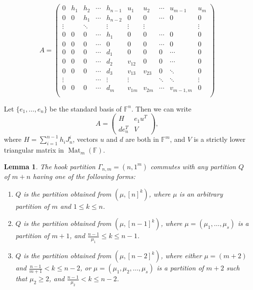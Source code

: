\documentclass[10pt,a4paper]{amsart}
\newtheorem{lem}[thm]{Lemma}
\begin{document}
\begin{equation}\label{generic in U}
A=\left(\begin{array}{ccccc|ccccc}
    0 & h_1 & h_2 & \cdots & h_{n-1} & u_1 & u_2 & \cdots & u_{m-1} & u_{m}\\
    0 & 0   & h_1 & \cdots & h_{n-2} & 0   & 0   & \cdots & 0        & 0\\
    \vdots &     & \ddots &        & \vdots & \vdots & \vdots &        &        & \vdots\\
    0 & 0   & 0   & \cdots & h_1     & 0   & 0   & \cdots & 0        & 0\\ 
     0 & 0   & 0   & \cdots & 0     & 0   & 0   & \cdots & 0        & 0\\
    \hline
    0 & 0   & 0   & \cdots & d_1     & 0   & 0   & 0 & \cdots       & 0\\
    0 & 0   & 0   & \cdots & d_2     & v_{12}   &0 & 0& \cdots      &0\\
    0 & 0   & 0   & \cdots & d_3     & v_{13}& v_{23}& 0 & \ddots  & 0\\
    \vdots &     &        & \cdots & \vdots & \vdots &       & \ddots & \ddots & \vdots\\
    0 & 0   & 0   & \cdots & d_m     & v_{1m} & v_{2m} & \cdots & v_{m-1,m} & 0\\
\end{array}
\right)
\end{equation}


Let $\{e_1, \ldots, e_n\}$ be the standard basis of $\mathbb{F}^n$. Then we can write 
\begin{equation}\label{blocks of generic in U}
A=\left( 
\begin{array}{c|c}
  H   & e_1 u^T \\
  \hline
  d e_n^T   & V
\end{array}
\right),
\end{equation}
where $H=\sum\limits_{i=1}^{n-1}h_iJ_n^i$, vectors $u$ and $d$ are both in $\mathbb{F}^m$, and $V$ is a strictly lower triangular matrix in $\operatorname{Mat}_{m}(\mathbb{F})$.

\begin{lem}\label{commute with hook}
    The hook partition $\Gamma_{n,m}=\left(n,1^m\right)$ commutes with any partition $Q$ of $m+n$ having one of the following forms:
    \begin{enumerate}
        \item[(a)] $Q$ is the partition obtained from $\left(\mu, [n]^k\right)$, where $\mu$ is an arbitrary partition of $m$ and $1\leq k\leq n$.
        \item[(b)] $Q$ is the partition obtained from $\left(\mu,[n-1]^k\right)$, where $\mu=(\mu_1,\ldots, \mu_s)$ is a partition of $m+1$, and $\frac{n-1}{\mu_1}\leq k \leq n-1$.
        \item[(c)] $Q$ is the partition obtained from $\left(\mu, [n-2]^k\right)$, where either $\mu=(m+2)$ and $\frac{n-1}{m+1}< k \leq n-2$, or $\mu=(\mu_1, \mu_2, \ldots, \mu_s)$ is a partition of $m+2$ such that $\mu_2\geq 2$, and $\frac{n-1}{\mu_2}< k \leq n-2$.
        \end{enumerate}
\end{lem}
\end{document}
